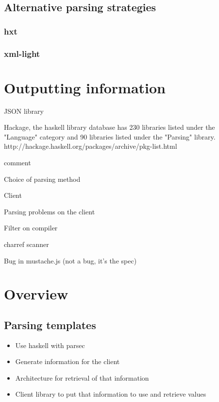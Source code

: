 \subsection{Alternative parsing strategies}
\subsubsection{hxt}
\subsubsection{xml-light}

\section{Outputting information}
JSON library

Hackage, the haskell library database has 230 libraries listed under the
"Language" category and 90 libraries listed under the "Parsing" library.
http://hackage.haskell.org/packages/archive/pkg-list.html

comment

Choice of parsing method

Client

Parsing problems on the client

Filter on compiler

charref scanner

Bug in mustache.js (not a bug, it's the spec)
\section{Overview}
\subsection{Parsing templates}

\begin{itemize}
\item Use haskell with parsec
\item Generate information for the client
\item Architecture for retrieval of that information
\item Client library to put that information to use and retrieve values
\end{itemize}

